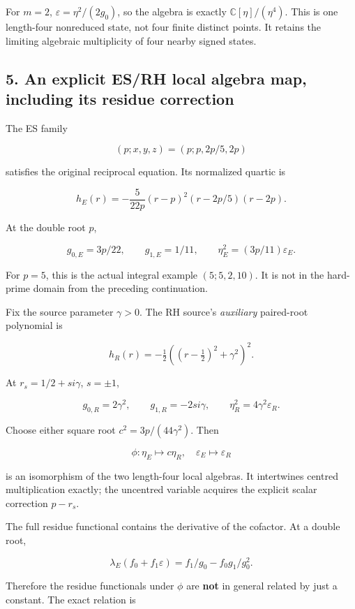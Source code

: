 For \(m=2\), \(\varepsilon=\eta^2/(2g_0)\), so the algebra is exactly
\(\mathbb C[\eta]/(\eta^4)\). This is one length-four nonreduced state,
not four finite distinct points. It retains the limiting algebraic
multiplicity of four nearby signed states.

\subsection{5. An explicit ES/RH local algebra map, including its
residue
correction}\label{an-explicit-esrh-local-algebra-map-including-its-residue-correction}

The ES family

\[
 (p;x,y,z)=(p;p,2p/5,2p)
\]

satisfies the original reciprocal equation. Its normalized quartic is

\[
 h_E(r)=-\frac5{22p}(r-p)^2(r-2p/5)(r-2p).
\]

At the double root \(p\),

\[
 g_{0,E}=3p/22,\qquad g_{1,E}=1/11,
 \qquad\eta_E^2=(3p/11)\varepsilon_E.
\]

For \(p=5\), this is the actual integral example \((5;5,2,10)\). It is
not in the hard-prime domain from the preceding continuation.

Fix the source parameter \(\gamma>0\). The RH source's \emph{auxiliary}
paired-root polynomial is

\[
 h_R(r)=-\tfrac12((r-\tfrac12)^2+\gamma^2)^2.
\]

At \(r_s=1/2+s i\gamma\), \(s=\pm1\),

\[
 g_{0,R}=2\gamma^2,\qquad g_{1,R}=-2s i\gamma,
 \qquad\eta_R^2=4\gamma^2\varepsilon_R.
\]

Choose either square root \(c^2=3p/(44\gamma^2)\). Then

\[
 \phi:\eta_E\mapsto c\eta_R,\quad
 \varepsilon_E\mapsto\varepsilon_R
\]

is an isomorphism of the two length-four local algebras. It intertwines
centred multiplication exactly; the uncentred variable acquires the
explicit scalar correction \(p-r_s\).

The full residue functional contains the derivative of the cofactor. At
a double root,

\[
 \lambda_E(f_0+f_1\varepsilon)
 =f_1/g_0-f_0g_1/g_0^2.
\]

Therefore the residue functionals under \(\phi\) are \textbf{not} in
general related by just a constant. The exact relation is

